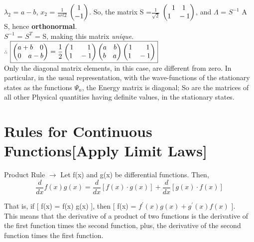 \documentclass[a4paper, 10pt, onepage]{elegantbook}
\begin{document}
$\lambda_2$ = $a - b$, $x_2$ = $\frac{1}{srt{2}}$ $\begin{pmatrix}1 \cr -1 \end{pmatrix}$. So, the matrix S =$\frac{1}{\sqrt{2}}$ $\begin{pmatrix}1\quad 1 \cr 1 \quad -1 \end{pmatrix}$, and $\Lambda$ = $S^{-1}$ A S, hence \textbf{orthonormal}. \\

$S^{-1}$ = $S^{T}$ = S, making this matrix \emph{unique}. \\

$\therefore$ $\boxed{\begin{pmatrix}a + b \quad 0 \cr0 \quad a - b \end{pmatrix} = \frac{1}{2} \begin{pmatrix}1 \quad \quad 1 \cr 1 \quad -1 \end{pmatrix} \begin{pmatrix}a \quad b \cr b \quad a \end{pmatrix} \begin{pmatrix}1 \quad \quad 1 \cr 1 \quad -1 \end{pmatrix}}$   \\

Only the diagonal matrix elements, in this case, are different from zero. In particular, in the usual representation, with the wave-functions of the stationary states as the functions $\Psi_n$, the Energy matrix is diagonal; So are the matrices of all other Physical quantities having definite values, in the stationary states.   \\

\section{Rules for Continuous Functions[Apply Limit Laws]}

Product Rule $\rightarrow$ Let f(x) and g(x) be differential functions. Then,  \\
\begin{equation}
\boxed{\frac{d}{dx}f(x)g(x) = \frac{d}{dx} [ f(x) \cdot g(x) ] + \frac{d}{dx} [ g(x) \cdot f(x) ]}
\end{equation}

That is, if [ f(x) = f(x) g(x) ], then [ f(x) = $f^{'}(x) g(x) + g^{'}(x) f(x)$ ].  \\

This means that the derivative of a product of two functions is the derivative of the first function times the second function, plus, the derivative of the second function times the first function.
\end{document}
